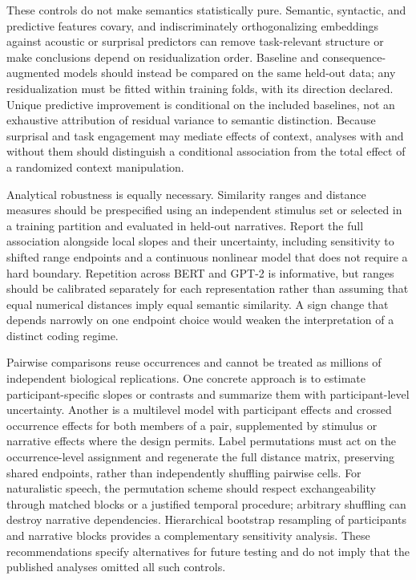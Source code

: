 \documentclass[11pt]{article}
\begin{document}
These controls do not make semantics statistically pure. Semantic,
syntactic, and predictive features covary, and indiscriminately
orthogonalizing embeddings against acoustic or surprisal predictors can
remove task-relevant structure or make conclusions depend on
residualization order. Baseline and consequence-augmented models should
instead be compared on the same held-out data; any residualization must
be fitted within training folds, with its direction declared. Unique
predictive improvement is conditional on the included baselines, not an
exhaustive attribution of residual variance to semantic distinction.
Because surprisal and task engagement may mediate effects of context,
analyses with and without them should distinguish a conditional
association from the total effect of a randomized context manipulation.

Analytical robustness is equally necessary. Similarity ranges and
distance measures should be prespecified using an independent stimulus
set or selected in a training partition and evaluated in held-out
narratives. Report the full association alongside local slopes and their
uncertainty, including sensitivity to shifted range endpoints and a
continuous nonlinear model that does not require a hard boundary.
Repetition across BERT and GPT-2 is informative, but ranges should be
calibrated separately for each representation rather than assuming that
equal numerical distances imply equal semantic similarity. A sign change
that depends narrowly on one endpoint choice would weaken the
interpretation of a distinct coding regime.

Pairwise comparisons reuse occurrences and cannot be treated as millions
of independent biological replications. One concrete approach is to
estimate participant-specific slopes or contrasts and summarize them
with participant-level uncertainty. Another is a multilevel model with
participant effects and crossed occurrence effects for both members of a
pair, supplemented by stimulus or narrative effects where the design
permits. Label permutations must act on the occurrence-level assignment
and regenerate the full distance matrix, preserving shared endpoints,
rather than independently shuffling pairwise cells. For naturalistic
speech, the permutation scheme should respect exchangeability through
matched blocks or a justified temporal procedure; arbitrary shuffling
can destroy narrative dependencies. Hierarchical bootstrap resampling of
participants and narrative blocks provides a complementary sensitivity
analysis. These recommendations specify alternatives for future testing
and do not imply that the published analyses omitted all such controls.
\end{document}
